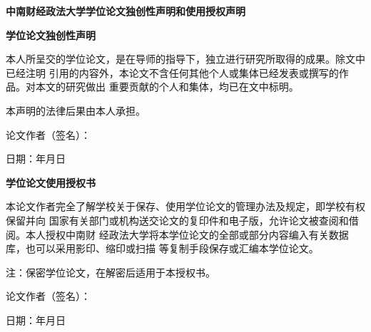 \begin{creative}

\vspace{1cm}
\begin{center}
{\sanhao \heiti \bfseries 中南财经政法大学学位论文独创性声明和使用授权声明}
\end{center}

\begin{center}
{\sihao \heiti \bfseries 学位论文独创性声明}
\end{center}


本人所呈交的学位论文，是在导师的指导下，独立进行研究所取得的成果。除文中已经注明
引用的内容外，本论文不含任何其他个人或集体已经发表或撰写的作品。对本文的研究做出
重要贡献的个人和集体，均已在文中标明。

本声明的法律后果由本人承担。
\vspace{1cm}

\hspace{20em}论文作者（签名）：     

\hspace{20em}日期：\hspace{2em}年\hspace{2em}月\hspace{2em}日
\vspace{2cm}

\begin{center}
{\sihao \heiti \bfseries 学位论文使用授权书}
\end{center}

本论文作者完全了解学校关于保存、使用学位论文的管理办法及规定，即学校有权保留并向
国家有关部门或机构送交论文的复印件和电子版，允许论文被查阅和借阅。本人授权中南财
经政法大学将本学位论文的全部或部分内容编入有关数据库，也可以采用影印、缩印或扫描
等复制手段保存或汇编本学位论文。

注：保密学位论文，在解密后适用于本授权书。

\vspace{1cm}
\hspace{20em}论文作者（签名）：

\hspace{20em}日期：\hspace{2em}年\hspace{2em}月\hspace{2em}日

\end{creative}